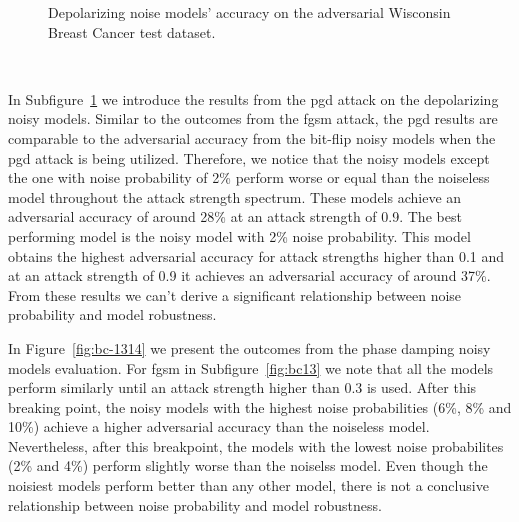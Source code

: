 \begin{figure}[!h]
\begin{subfigure}{0.45\textwidth}
      \label{fig:bc12}
  \end{subfigure}
  \caption{Depolarizing noise models' accuracy on the adversarial Wisconsin Breast Cancer test dataset.}
  \label{fig:bc-1112}
\end{figure} \

In Subfigure~\ref{fig:bc12} we introduce the results from the \ac{pgd}
attack on the depolarizing noisy models. Similar to the outcomes
from the \ac{fgsm} attack, the \ac{pgd} results are comparable to
the adversarial accuracy from the bit-flip noisy models when the \ac{pgd}
attack is being utilized. Therefore, we notice that the noisy models
except the one with noise probability of 2\% perform worse or equal
than the noiseless model throughout the attack strength spectrum. 
These models achieve an adversarial accuracy of around 28\% at
an attack strength of 0.9. The best performing model is the noisy
model with 2\% noise probability. This model obtains the highest
adversarial accuracy for attack strengths higher than 0.1 and
at an attack strength of 0.9 it achieves an adversarial accuracy
of around 37\%. From these results we can't derive a significant
relationship between noise probability and model robustness. \

In Figure~\ref{fig:bc-1314} we present the outcomes from the phase damping
noisy models evaluation. For \ac{fgsm} in Subfigure~\ref{fig:bc13}
we note that all the models perform similarly until an attack strength
higher than 0.3 is used. After this breaking point, the noisy models
with the highest noise probabilities (6\%, 8\% and 10\%) achieve
a higher adversarial accuracy than the noiseless model. Nevertheless,
after this breakpoint, the models with the lowest noise probabilites
(2\% and 4\%) perform slightly worse than the noiselss model. Even
though the noisiest models perform better than any other model, there
is not a conclusive relationship between noise probability and model
robustness. \


